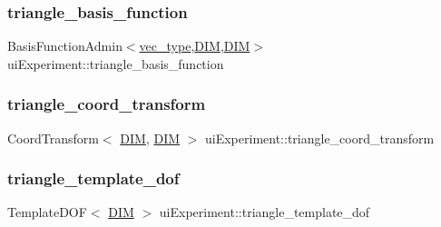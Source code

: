 \mbox{\label{classui_experiment_a4afff2bbca9b68fe61856dcf07456d2c}} 
\subsubsection{\texorpdfstring{triangle\+\_\+basis\+\_\+function}{triangle\_basis\_function}\hspace{0.1cm}{\footnotesize\ttfamily [2/2]}}
{\footnotesize\ttfamily Basis\+Function\+Admin$<$\mbox{\hyperlink{complex__edge___t_h_f_e_m_2emdefs_8h_a0a0de407de54661e0d56aa8686c104d9}{vec\+\_\+type}},\mbox{\hyperlink{complex__node___t_h_f_e_m_2uiexp_8h_a589b8b9bfdf714f736059845d568b597}{D\+IM}},\mbox{\hyperlink{complex__node___t_h_f_e_m_2uiexp_8h_a589b8b9bfdf714f736059845d568b597}{D\+IM}}$>$ ui\+Experiment\+::triangle\+\_\+basis\+\_\+function\hspace{0.3cm}{\ttfamily [private]}}

\mbox{\label{classui_experiment_a83ec25f4aedfaca2d4878b15efc82315}} 
\subsubsection{\texorpdfstring{triangle\+\_\+coord\+\_\+transform}{triangle\_coord\_transform}}
{\footnotesize\ttfamily Coord\+Transform$<$ \mbox{\hyperlink{complex__node___t_h_f_e_m_2uiexp_8h_a589b8b9bfdf714f736059845d568b597}{D\+IM}}, \mbox{\hyperlink{complex__node___t_h_f_e_m_2uiexp_8h_a589b8b9bfdf714f736059845d568b597}{D\+IM}} $>$ ui\+Experiment\+::triangle\+\_\+coord\+\_\+transform\hspace{0.3cm}{\ttfamily [private]}}

\mbox{\label{classui_experiment_a513ca14667fb30909ea3aef90e13200c}} 
\subsubsection{\texorpdfstring{triangle\+\_\+template\+\_\+dof}{triangle\_template\_dof}}
{\footnotesize\ttfamily Template\+D\+OF$<$ \mbox{\hyperlink{complex__node___t_h_f_e_m_2uiexp_8h_a589b8b9bfdf714f736059845d568b597}{D\+IM}} $>$ ui\+Experiment\+::triangle\+\_\+template\+\_\+dof\hspace{0.3cm}{\ttfamily [private]}}

